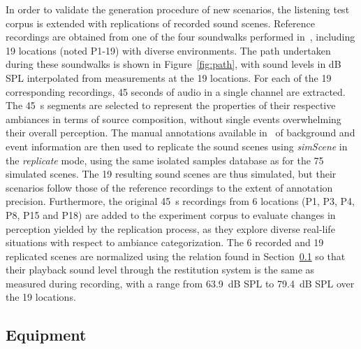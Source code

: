 \documentclass[twocolumn]{article}
\begin{document}
In order to validate the generation procedure of new scenarios, the listening test corpus is extended with replications of recorded sound scenes. Reference recordings are obtained from one of the four soundwalks performed in~\cite{aumond2017}, including 19 locations (noted P1-19) with diverse environments. The path undertaken during these soundwalks is shown in Figure~\ref{fig:path}, with sound levels in dB SPL interpolated from measurements at the 19 locations. For each of the 19 corresponding recordings, 45 seconds of audio in a single channel are extracted. The 45~s segments are selected to represent the properties of their respective ambiances in terms of source composition, without single events overwhelming their overall perception. The manual annotations available in~\cite{gloaguen2017} of background and event information are then used to replicate the sound scenes using \textit{simScene} in the \textit{replicate} mode, using the same isolated samples database as for the 75 simulated scenes. The 19 resulting sound scenes are thus simulated, but their scenarios follow those of the reference recordings to the extent of annotation precision. Furthermore, the original 45~s recordings from 6 locations (P1, P3, P4, P8, P15 and P18) are added to the experiment corpus to evaluate changes in perception yielded by the replication process, as they explore diverse real-life situations with respect to ambiance categorization. The 6 recorded and 19 replicated scenes are normalized using the relation found in Section~\ref{sec:exp_equi} so that their playback sound level through the restitution system is the same as measured during recording, with a range from 63.9~dB SPL to 79.4~dB SPL over the 19 locations.

\subsection{Equipment}
\label{sec:exp_equi}
\end{document}
